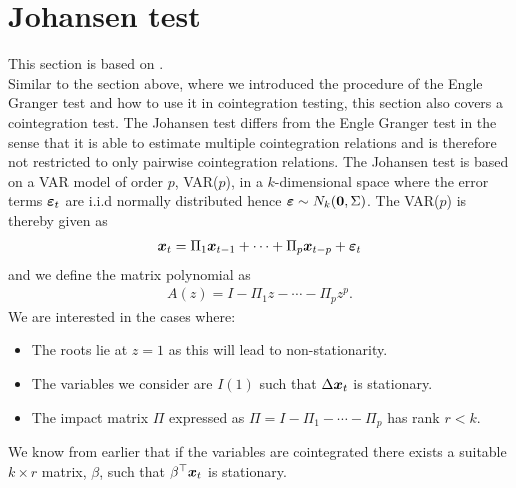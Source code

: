 \section{Johansen test}\label{sect:johansen test}
This section is based on \cite{Johansen_test}.\\
Similar to the section above, where we introduced the procedure of the Engle Granger test and how to use it in cointegration testing, this section also covers a cointegration test. The Johansen test differs from the Engle Granger test in the sense that it is able to estimate multiple cointegration relations and is therefore not restricted to only pairwise cointegration relations. The Johansen test is based on a VAR model of order $p$, VAR($p$), in a $k$-dimensional space where the error terms $\boldsymbol{\varepsilon}_t$ are i.i.d normally distributed hence $\boldsymbol{\varepsilon}\sim N_k(\boldsymbol{0},\Sigma)$. The VAR($p$) is thereby given as
\begin{align}\label{eq:var_p_johansen}
\boldsymbol{x}_t=\Pi_1\boldsymbol{x}_{t-1}+\cdots+\Pi_p\boldsymbol{x}_{t-p}+\boldsymbol{\varepsilon}_t
\end{align}
and we define the matrix polynomial as
\begin{align*}
    A(z)=I-\Pi_1z-\cdots-\Pi_pz^p.
\end{align*}
We are interested in the cases where: 
\begin{itemize}
    \item The roots lie at $z=1$ as this will lead to non-stationarity.
    \item The variables we consider are $I(1)$ such that $\Delta \boldsymbol{x}_t$ is stationary.
    \item The impact matrix $\Pi$ expressed as $\Pi=I-\Pi_1-\cdots-\Pi_p$ has rank $r<k$.
\end{itemize}  
We know from earlier that if the variables are cointegrated there exists a suitable $k\times r$ matrix, $\beta$, such that $\beta^\top \boldsymbol{x}_t$ is stationary.\\

